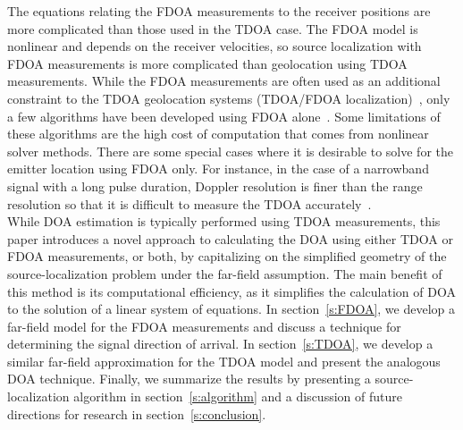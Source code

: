The equations relating the FDOA measurements to the receiver positions are more complicated than those used in the TDOA case. The FDOA model is nonlinear and depends on the receiver velocities, so source localization with FDOA measurements is more complicated than geolocation using TDOA measurements. While the FDOA measurements are often used as an additional constraint to the TDOA geolocation systems (TDOA/FDOA localization)~\cite{Ho1997}, only a few algorithms have been developed using FDOA alone~\cite{Cameron,Jinzhou2012}. Some limitations of these algorithms are the high cost of computation that comes from nonlinear solver methods. There are some special cases where it is desirable to solve for the emitter location using FDOA only. For instance, in the case of a narrowband signal with a long pulse duration, Doppler resolution is finer than the range resolution so that it is difficult to measure the TDOA accurately~\cite{Cheney2009,Mason2005,Jinzhou2012}. \\

While DOA estimation is typically performed using TDOA measurements, this paper introduces a novel approach to calculating the DOA using either TDOA or FDOA measurements, or both, by capitalizing on the simplified geometry of the source-localization problem under the far-field assumption. The main benefit of this method is its computational efficiency, as it simplifies the calculation of DOA to the solution of a linear system of equations. In section~\ref{s:FDOA}, we develop a far-field model for the FDOA measurements and discuss a technique for determining the signal direction of arrival. In section~\ref{s:TDOA}, we develop a similar far-field approximation for the TDOA model and present the analogous DOA technique. Finally, we summarize the results by presenting a source-localization algorithm in section~\ref{s:algorithm} and a discussion of future directions for research in section~\ref{s:conclusion}.
